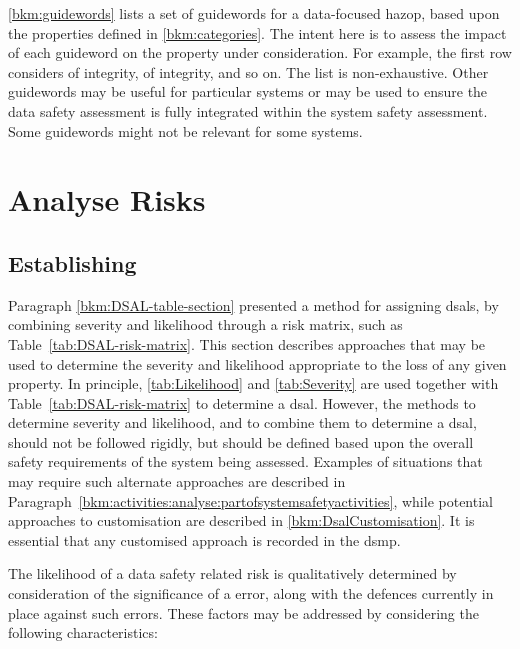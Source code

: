 \autoref{bkm:guidewords} lists a set of guidewords for a data-focused \gls{hazop}, based upon the properties defined in \autoref{bkm:categories}. The intent here is to assess the impact of each guideword on the property under consideration. For example, the first row considers  of \gls{integrity},  of \gls{integrity}, and so on.
The list is non-exhaustive. Other guidewords may be useful for particular systems or may be used to ensure the \gls{data safety assessment} is fully integrated within the system safety assessment. Some guidewords might not be relevant for some systems.
\clearpage
\section{Analyse Risks}
\subsection{Establishing }
\label{bkm:Establishing-DSALS}
Paragraph \ref*{bkm:DSAL-table-section}
presented a method for assigning \glspl{dsal}, by combining severity and likelihood through a risk matrix, such as Table~\ref{tab:DSAL-risk-matrix}. This section describes approaches that may be used to determine the severity and likelihood appropriate to the loss of any given property. In principle, \autoref {tab:Likelihood} and \autoref{tab:Severity} are used together with Table~\ref{tab:DSAL-risk-matrix} to determine a \gls{dsal}. However, the methods to determine severity and likelihood, and to combine them to determine a \gls{dsal}, should not be followed rigidly, but should be defined based upon the overall safety requirements of the system being assessed. Examples of situations that may require such alternate approaches are described in
Paragraph~\ref{bkm:activities:analyse:partofsystemsafetyactivities},
while potential approaches to customisation are described in \autoref{bkm:DsalCustomisation}.
It is essential that any customised approach is recorded in the \gls{dsmp}.

The likelihood of a data safety related risk is qualitatively determined by
consideration of the significance of a \gls{error}, along with the defences currently in place against such errors. These factors may be addressed by
considering the following characteristics:

